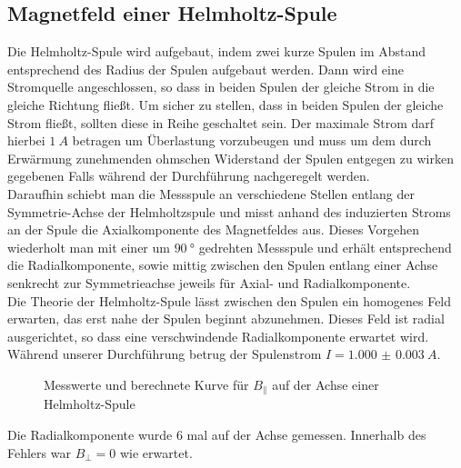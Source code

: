 \subsection{Magnetfeld einer Helmholtz-Spule}
Die Helmholtz-Spule wird aufgebaut, indem zwei kurze Spulen im Abstand entsprechend des Radius der Spulen aufgebaut werden. Dann wird eine Stromquelle angeschlossen, so dass in beiden Spulen der gleiche Strom in die gleiche Richtung fließt. Um sicher zu stellen, dass in beiden Spulen der gleiche Strom fließt, sollten diese in Reihe geschaltet sein. Der maximale Strom darf hierbei $ \SI{1}{A} $ betragen um Überlastung vorzubeugen und muss um dem durch Erwärmung zunehmenden ohmschen Widerstand der Spulen entgegen zu wirken gegebenen Falls während der Durchführung nachgeregelt werden. \\
Daraufhin schiebt man die Messspule an verschiedene Stellen entlang der Symmetrie-Achse der Helmholtzspule und misst anhand des induzierten Stroms an der Spule die Axialkomponente des Magnetfeldes aus. Dieses Vorgehen wiederholt man mit einer um $ \SI{90}{\degree} $ gedrehten Messspule und erhält entsprechend die Radialkomponente, sowie mittig zwischen den Spulen entlang einer Achse senkrecht zur Symmetrieachse jeweils für Axial- und Radialkomponente.\\
Die Theorie der Helmholtz-Spule lässt zwischen den Spulen ein homogenes Feld erwarten, das erst nahe der Spulen beginnt abzunehmen. Dieses Feld ist radial ausgerichtet, so dass eine verschwindende Radialkomponente erwartet wird. \\
Während unserer Durchführung betrug der Spulenstrom $ I= \SI{1.000(3)}{A} $.

\begin{figure}[H]
\centering
{}
\caption{Messwerte und berechnete Kurve für $B_\parallel$ auf der Achse einer Helmholtz-Spule}
\label{fig:axialaufachsehelm}
\end{figure}
Die Radialkomponente wurde 6 mal auf der Achse gemessen. Innerhalb des Fehlers war $B_\bot=0$ wie erwartet. \\

